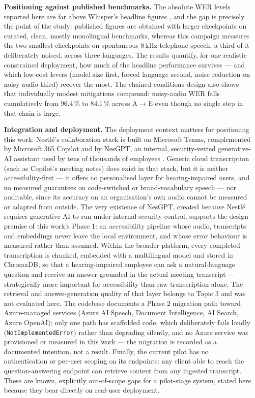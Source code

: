 \documentclass[12pt]{report}
\begin{document}
\textbf{Positioning against published benchmarks.} The absolute WER levels reported here are far above Whisper's headline figures \cite{radford2023robust}, and the gap is precisely the point of the study: published figures are obtained with larger checkpoints on curated, clean, mostly monolingual benchmarks, whereas this campaign measures the two smallest checkpoints on spontaneous 8\,kHz telephone speech, a third of it deliberately noised, across three languages. The results quantify, for one realistic constrained deployment, how much of the headline performance survives --- and which low-cost levers (model size first, forced language second, noise reduction on noisy audio third) recover the most. The chained-conditions design also shows that individually modest mitigations compound: noisy-audio WER falls cumulatively from 96.4\,\% to 84.1\,\% across A$\to$E even though no single step in that chain is large.

\textbf{Integration and deployment.} The deployment context matters for positioning this work: Nestl\'e's collaboration stack is built on Microsoft Teams, complemented by Microsoft 365 Copilot and by NesGPT, an internal, security-vetted generative-AI assistant used by tens of thousands of employees \cite{worklife2024nesgpt,arec2023nestle}. Generic cloud transcription (such as Copilot's meeting notes) does exist in that stack, but it is neither accessibility-first --- it offers no personalised layer for hearing-impaired users, and no measured guarantees on code-switched or brand-vocabulary speech --- nor auditable, since its accuracy on an organisation's own audio cannot be measured or adapted from outside. The very existence of NesGPT, created because Nestl\'e requires generative AI to run under internal security control, supports the design premise of this work's Phase 1: an accessibility pipeline whose audio, transcripts and embeddings never leave the local environment, and whose error behaviour is measured rather than assumed. Within the broader platform, every completed transcription is chunked, embedded with a multilingual model and stored in ChromaDB, so that a hearing-impaired employee can ask a natural-language question and receive an answer grounded in the actual meeting transcript --- strategically more important for accessibility than raw transcription alone. The retrieval and answer-generation quality of that layer belongs to Topic 3 and was not evaluated here. The codebase documents a Phase 2 migration path toward Azure-managed services (Azure AI Speech, Document Intelligence, AI Search, Azure OpenAI); only one path has scaffolded code, which deliberately fails loudly (\texttt{NotImplementedError}) rather than degrading silently, and no Azure service was provisioned or measured in this work --- the migration is recorded as a documented intention, not a result. Finally, the current pilot has no authentication or per-user scoping on its endpoints: any client able to reach the question-answering endpoint can retrieve content from any ingested transcript. These are known, explicitly out-of-scope gaps for a pilot-stage system, stated here because they bear directly on real-user deployment.
\end{document}
